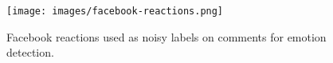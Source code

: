 \documentclass[12pt,a4paper]{report}
\theoremstyle{definition}
\begin{document}
\begin{CJK}{UTF8}{bsmi}
    \begin{figure}[H]
        \centering
        \texttt{[image: images/facebook-reactions.png]}
        \caption{Facebook reactions used as noisy labels on comments for emotion detection.}
        \label{fig:reactions}
    \end{figure}


\end{CJK}
\end{document}
